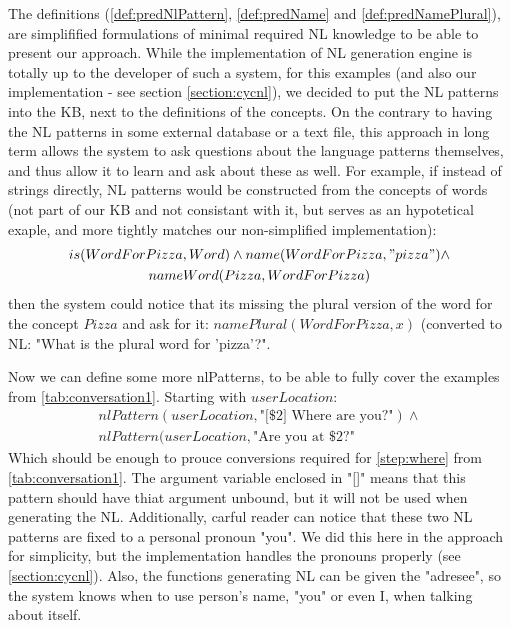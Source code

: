 The definitions (\autoref{def:predNlPattern}, \autoref{def:predName} and
\autoref{def:predNamePlural}),
are simplifified formulations of minimal required NL knowledge to be able to 
present our approach. While the implementation of NL generation engine is 
totally up to the developer of such a system, for this examples (and also 
our implementation - see section \ref{section:cycnl}), we decided to 
put the NL patterns
into the KB, next to the definitions of the concepts. On the contrary to
having the NL patterns in some external database or a text file, this approach
in long term allows the system to ask questions about the language patterns
themselves, and thus allow it to learn and ask about these as well. For example,
if instead of strings directly, NL patterns would be constructed from the 
concepts of words (not part of our KB and not consistant with it, but serves 
as an hypotetical exaple, and more tightly matches our non-simplified 
implementation):
\begin{equation*}
\begin{gathered}
is(WordForPizza, Word) \land name(WordForPizza, "pizza")\land\\
nameWord(Pizza,WordForPizza)
\end{gathered}
\end{equation*}
then the system could notice that its missing the plural version of the word
for the concept $Pizza$ and ask for it: $namePlural(WordForPizza,x)$ 
(converted to NL: "What is the plural word for 'pizza'?".

Now we can define some more nlPatterns, to be able to fully cover the
examples from \autoref{tab:conversation1}. Starting with $userLocation$:
\begin{equation}\label{as:nl:userLocation}
\begin{gathered}
    nlPattern(userLocation,\text{"[\$2] Where are you?"}) \land \\
    nlPattern(userLocation,\text{"Are you at \$2?"}
\end{gathered}
\end{equation}
Which should be enough to prouce conversions required for \autoref{step:where}
from \autoref{tab:conversation1}. The argument variable enclosed in "[]" means
that this pattern should have thiat argument unbound, but it will not be 
used when generating the NL. Additionally, carful reader can notice that these
two NL patterns are fixed to a personal pronoun "you". We did this here in the
approach for simplicity, but the implementation handles the pronouns properly
(see \autoref{section:cycnl}). Also, the functions generating NL can be given
the "adresee", so the system knows when to use person's name, "you" or even
I, when talking about itself.

